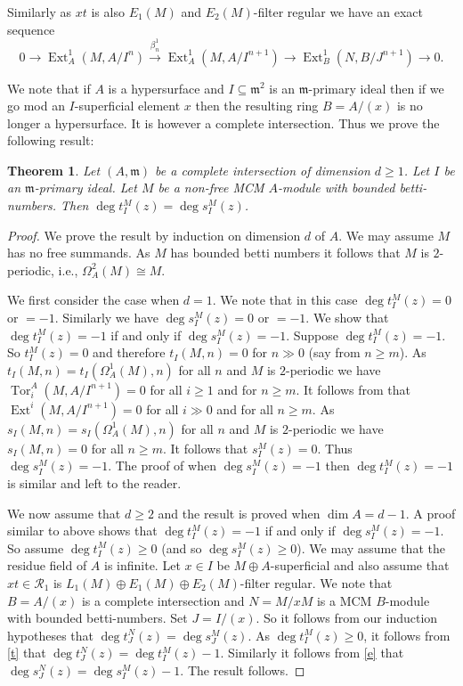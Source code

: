 \documentclass{amsart}
\newcommand{\m}{\mathfrak{m} }
\newcommand{\R}{\mathcal{R} }
\newcommand{\rt}{\rightarrow}
\newcommand{\Tor}{\operatorname{Tor}}
\newcommand{\Ext}{\operatorname{Ext}}
\theoremstyle{plain}
\newtheorem{theorem}{Theorem}[section]
\theoremstyle{definition}
\theoremstyle{remark}
\begin{document}
Similarly as $xt$ is also $E_1(M)$ and $E_2(M)$-filter regular we have an exact sequence
\s\label{e}
$$0 \rt  \Ext^1_A(M, A/I^n) \xrightarrow{\beta^1_n} \Ext_A^1(M, A/I^{n+1}) \rt \Ext_B^1(N, B/J^{n+1}) \rt 0.$$

\s We note that if $A$ is a hypersurface and $I \subseteq \m^2$ is an $\m$-primary ideal then if we go mod an $I$-superficial element $x$ then the resulting ring $B = A/(x)$ is no longer a hypersurface. It is however a complete intersection. Thus we prove the following result:
\begin{theorem}
\label{ci} Let $(A,\m)$ be a complete intersection of dimension $d \geq 1$. Let $I$ be an $\m$-primary ideal. Let $M$ be a non-free MCM $A$-module with bounded betti-numbers. Then $\deg t^M_I(z) = \deg s^M_I(z)$.
\end{theorem}
\begin{proof}
We prove the result by induction on dimension $d$ of $A$. We may assume $M$ has no free summands. As $M$ has bounded betti numbers it follows that $M$ is $2$-periodic, i.e., $\Omega^2_A(M) \cong M$.

 We first consider the case when $d = 1$.  We note that in this case $\deg t^M_I(z) = 0 $ or $ = -1$. Similarly we have  $\deg s^M_I(z) = 0 $ or $ = -1$. We show that  $\deg t^M_I(z) = -1  $ if and only if $\deg s^M_I(z) = -1  $.
Suppose  $\deg t^M_I(z) = -1  $. So $t_I^M(z) = 0$ and therefore
 $t_I(M, n) = 0$ for $n \gg 0$ (say from $n \geq m$). As $t_I(M, n) = t_I(\Omega^1_A(M), n)$ for all $n$ and $M$ is $2$-periodic we have $\Tor^A_i(M, A/I^{n +1}) = 0$ for all $i \geq 1$ and for $n \geq m$. It follows from \cite[Theorem III]{AB} that $\Ext^i(M, A/I^{n +1}) = 0$ for all $i \gg 0$ and for all $n \geq m$. As $s_I(M, n) = s_I(\Omega^1_A(M), n)$ for all $n$ and $M$ is $2$-periodic we have
$s_I(M, n) = 0$ for all $n \geq m$. It follows that $s_I^M(z) = 0$. Thus $\deg s^M_I(z) = -1  $.  The proof of when $\deg s^M_I(z) = -1  $ then $\deg t^M_I(z) = -1  $ is similar and left to the reader.

We now assume that $d \geq 2$ and the result is proved when $\dim A = d -1$.
A proof similar to above shows that $\deg t^M_I(z) = -1  $ if and only if $\deg s^M_I(z) = -1  $. So assume  $\deg t^M_I(z) \geq 0$ (and so  $\deg s^M_I(z) \geq 0 $). We may assume that the residue field of $A$ is infinite. Let $x \in I$ be $M \oplus A$-superficial and also assume that $xt \in \R_1$ is $L_1(M) \oplus E_1(M) \oplus E_2(M)$-filter regular.
We note that $B = A/(x)$ is a complete intersection and $N = M/xM$ is a MCM $B$-module with bounded betti-numbers. Set $J = I/(x)$. So it follows from our induction hypotheses that
$\deg t^N_J(z) = \deg s^M_J(z)$. As $\deg t^M_I(z) \geq 0$, it follows from  \ref{t} that $\deg t^N_J(z) = \deg t^M_I(z) -1 $. Similarly it follows from \ref{e} that  $\deg s^N_J(z) = \deg s^M_I(z) -1 $. The result follows.
\end{proof}
\end{document}
